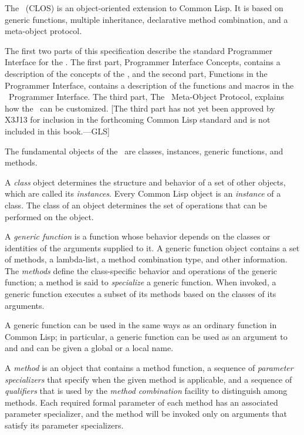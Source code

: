 The \CLOS\ (CLOS) is an object-oriented extension to Common Lisp. It is based on
generic functions, multiple inheritance, declarative method
combination, and a meta-object protocol.

The first two parts of this specification describe
the standard Programmer Interface for the \CLOS.  The first part,
Programmer Interface Concepts,
contains a description of the concepts of the \CLOS, and the second part,
Functions in the Programmer Interface,
contains a description of the functions and macros in the \CLOS\
Programmer Interface.  The third part, The \CLOS\ Meta-Object
Protocol, explains how the \CLOS\ can be customized.  [The third part
has not yet been approved by X3J13 for inclusion in the forthcoming
Common Lisp standard and is not included in this book.---GLS]

The fundamental objects of the \CLOS\ are classes, instances,
generic functions, and methods. 

A \emph{class\/} object determines the structure and behavior of a set
of other objects, which are called its \emph{instances}. 
Every Common Lisp object is an \emph{instance\/} of a class.  The class of an
object determines the set of operations that can be performed on the object. 

A \emph{generic function\/} is a function whose behavior depends on the
classes or identities of the arguments supplied to it.  A generic
function object contains a set of methods, a lambda-list, a
method combination type, and other information.  The \emph{methods} define
the class-specific behavior and operations of the generic function; a
method is said to \emph{specialize\/} a generic function.  When invoked,
a generic function executes a subset of its methods based on the
classes of its arguments.

A generic function can be used in 
the same ways as an ordinary function in Common Lisp; in
particular, a generic function can be used as an argument to 
 and  and can be given a global or a local name.

A \emph{method\/} is an object that contains a method function, a sequence of
\emph{parameter specializers\/} that specify when the given method is
applicable, and a sequence of \emph{qualifiers\/} that is used by the
\emph{method combination\/} facility to distinguish among methods.  Each
required formal parameter of each method has an associated parameter
specializer, and the method will be invoked only on arguments that
satisfy its parameter specializers.

